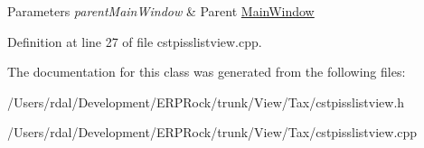 \begin{DoxyParams}{\-Parameters}
{\em parent\-Main\-Window} & \-Parent \hyperlink{class_main_window}{\-Main\-Window} \\
\hline
\end{DoxyParams}


\-Definition at line 27 of file cstpisslistview.\-cpp.



\-The documentation for this class was generated from the following files\-:\begin{DoxyCompactItemize}
\item 
/\-Users/rdal/\-Development/\-E\-R\-P\-Rock/trunk/\-View/\-Tax/cstpisslistview.\-h\item 
/\-Users/rdal/\-Development/\-E\-R\-P\-Rock/trunk/\-View/\-Tax/cstpisslistview.\-cpp\end{DoxyCompactItemize}
